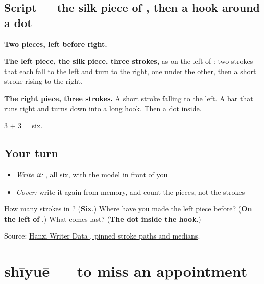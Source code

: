 \subsection*{Script — the silk piece of , then a hook around a dot}

\begin{quote}
\end{quote}

\textbf{Two pieces, left before right.}

\textbf{The left piece, the silk piece, three strokes,} as on the left of : two strokes that each fall to the left and turn to the right, one under the other, then a short stroke rising to the right.

\textbf{The right piece, three strokes.} A short stroke falling to the left. A bar that runs right and turns down into a long hook. Then a dot inside.

3 + 3 = six.

\subsection*{Your turn}
\begin{itemize}
\raggedright
  \item \emph{Write it:} , all six, with the model in front of you
  \item \emph{Cover:} write it again from memory, and count the pieces, not the strokes
\end{itemize}

\begin{tcolorbox}[breakable,colback=teal!4,colframe=teal!35!black,title={Before you move on}]
How many strokes in ? (\textbf{Six}.) Where have you made the left piece before? (\textbf{On the left of }.) What comes last? (\textbf{The dot inside the hook}.)

Source: \href{https://raw.githubusercontent.com/chanind/hanzi-writer-data/68d10a4b21150cae5e1ebbd223eed289cf32d90c/data/\%E7\%BA\%A6.json}{Hanzi Writer Data , pinned stroke paths and medians}.
\end{tcolorbox}
\section[shīyuē]{shīyuē — to miss an appointment}

\label{lesson:ZH-C388-shiyue}



